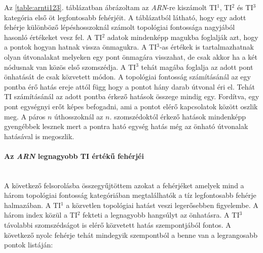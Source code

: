 \documentclass[a4paper,12pt]{article}
\begin{document}
				Az \ref{table:arnti123}. táblázatban ábrázoltam az \textit{ARN}-re kiszámolt TI$^1$, TI$^2$ és TI$^3$  kategória első öt legfontosabb fehérjéit. A táblázatból látható, hogy egy adott fehérje különböző lépéshosszoknál számolt topológiai fontossága nagyjából hasonló értékeket vesz fel. A TI$^2$ adatok mindenképp magukba foglalják azt, hogy a pontok hogyan hatnak vissza önmagukra. A TI$^3$-as értékek is tartalmazhatnak olyan útvonalakat melyeken egy pont önmagára visszahat, de csak akkor ha a két nódusnak van közös első szomszédja. A TI$^3$ tehát magába foglalja az adott pont önhatását de csak közvetett módon. A topológiai fontosság számításánál az egy pontba érő hatás ereje attól függ hogy a pontot hány darab útvonal éri el. Tehát TI számításánál az adott pontba érkező hatások összege mindig egy. Fordítva, egy pont egységnyi erőt képes befogadni, ami a pontot elérő kapcsolatok között oszlik meg. A páros $n$ úthosszoknál az $n$. szomszédoktól érkező hatások mindenképp gyengébbek lesznek mert a pontra ható egység hatás még az önható útvonalak hatásával is megoszlik.
				
				\paragraph{Az \textit{ARN} legnagyobb TI értékű fehérjéi} \mbox{}\\
				A következő felsorolásba összegyűjtöttem azokat a fehérjéket amelyek mind a három topológiai fontosság kategóriában megtalálhatók a tíz legfontosabb fehérje halmazában. 			
				A TI$^1$ a közvetlen topológiai hatást veszi legerősebben figyelembe. A három index közül a TI$^2$ fekteti a legnagyobb hangsúlyt az önhatásra. A TI$^3$  távolabbi szomszédságot is elérő közvetett hatás szempontjából fontos. A következő nyolc fehérje tehát mindegyik szempontból a benne van a legrangosabb pontok listáján:
				
\end{document}
